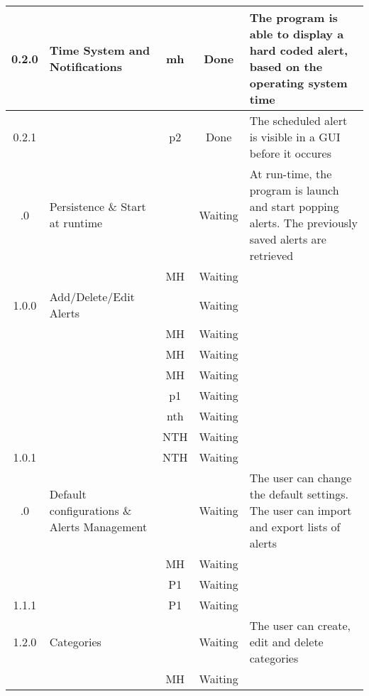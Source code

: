 \begin{longtable}{| c | p{5cm} | c | c | p{5cm} |}
	\rowcolor{aliceblue}0.2.0 & Time System and Notifications & \gls{mh} & Done & The program is able to display a hard coded alert, based on the operating system time \\ \hline
	\rowcolor{aliceblue}0.2.1 & \fullref{subsec:usecase_launch} & \gls{p2} & Done & The scheduled alert is visible in a GUI before it occures \\ \boldhr
	0.3.0 & Persistence \& Start at runtime & & Waiting & At run-time, the program is launch and start popping alerts. The previously saved alerts are retrieved \\ \hline
	& \fullref{subsec:usecase_auto_start} & MH & Waiting & \\ \boldhr
	\rowcolor{aliceblue}1.0.0 & Add/Delete/Edit Alerts & & Waiting &  \\ \hline
	\rowcolor{aliceblue}& \fullref{subsec:usecase_add_simple_alert} & MH & Waiting &  \\ \hline
	\rowcolor{aliceblue}& \fullref{subsec:usecase_delete_simple_alert} & MH & Waiting &  \\ \hline
	\rowcolor{aliceblue}& \fullref{subsec:usecase_edit_simple_alert} & MH & Waiting &  \\ \hline
	\rowcolor{aliceblue}& \fullref{subsec:usecase_add_periodic_alert} & \gls{p1} & Waiting &  \\ \hline
	\rowcolor{aliceblue}& \fullref{subsec:usecase_add_email_sender} & \gls{nth} & Waiting &  \\ \hline
	\rowcolor{aliceblue}& \fullref{subsec:usecase_delete_email_sender} & NTH & Waiting &  \\ \hline
	\rowcolor{aliceblue}1.0.1 & \fullref{subsec:usecase_edit_email_sender} & NTH & Waiting &  \\ \boldhr
	1.1.0 & Default configurations \& Alerts Management &  & Waiting & The user can change the default settings. The user can import and export lists of alerts\\ \hline
	& \fullref{subsec:usecase_edit_default_configuration} & MH & Waiting & \\ \hline
	& \fullref{subsec:usecase_import_alerts} & P1 & Waiting & \\ \hline
	1.1.1 & \fullref{subsec:usecase_export_alerts} & P1 & Waiting &\\ \boldhr
	\rowcolor{aliceblue}1.2.0 & Categories & & Waiting & The user can create, edit and delete categories \\ \hline
	\rowcolor{aliceblue}& \fullref{subsec:usecase_add_category} & MH & Waiting & \\ \hline

\end{longtable}
